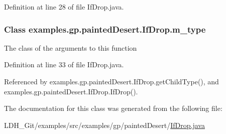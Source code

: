 Definition at line 28 of file If\-Drop.\-java.

\hypertarget{classexamples_1_1gp_1_1painted_desert_1_1_if_drop_aeb469a220d59f694f192033cbfb41f74}{
\subsubsection[{m\-\_\-type}]{\setlength{\rightskip}{0pt plus 5cm}Class examples.\-gp.\-painted\-Desert.\-If\-Drop.\-m\-\_\-type\hspace{0.3cm}{\ttfamily [private]}}}\label{classexamples_1_1gp_1_1painted_desert_1_1_if_drop_aeb469a220d59f694f192033cbfb41f74}
The class of the arguments to this function 

Definition at line 33 of file If\-Drop.\-java.



Referenced by examples.\-gp.\-painted\-Desert.\-If\-Drop.\-get\-Child\-Type(), and examples.\-gp.\-painted\-Desert.\-If\-Drop.\-If\-Drop().



The documentation for this class was generated from the following file\-:\begin{DoxyCompactItemize}
\item 
L\-D\-H\-\_\-\-Git/examples/src/examples/gp/painted\-Desert/\hyperlink{_if_drop_8java}{If\-Drop.\-java}\end{DoxyCompactItemize}
